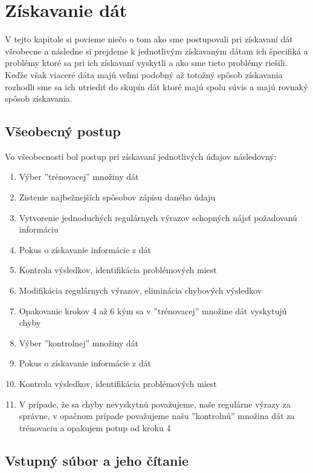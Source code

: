 \chapter{Získavanie dát}
\label{zisk}
V tejto kapitole si povieme niečo o tom ako sme postupovali pri získavaní dát všeobecne a následne si prejdeme k jednotlivým získavaným dátam ich špecifiká a problémy ktoré sa pri ich získavaní vyskytli a ako sme tieto problémy riešili. Keďže však viaceré dáta majú veľmi podobný až totožný spôsob získavania rozhodli sme sa ich utriediť do skupín dát ktoré majú spolu súvis a majú rovnaký spôsob získavania.

\section{Všeobecný postup}

Vo všeobecnosti bol postup pri získavaní jednotlivých údajov následovný:

\begin{enumerate}
	\item Výber ''trénovacej'' množiny dát 
	\item Zistenie najbežnejších spôsobov zápisu daného údaju
	\item Vytvorenie jednoduchých regulárnych výrazov schopných nájsť požadovanú informáciu
	\item Pokus o získavanie informácie z dát
	\item Kontrola výsledkov, identifikácia problémových miest 
	\item Modifikácia regulárnych výrazov, eliminácia chybových výsledkov
	\item Opakovanie krokov 4 až 6 kým sa v ''trénovacej'' množine dát vyskytujú chyby 
	\item Výber ''kontrolnej'' množiny dát
	\item Pokus o získavanie informácie z dát
	\item Kontrola výsledkov, identifikácia problémových miest
	\item V prípade, že sa chyby nevyskytnú považujeme, naše regulárne výrazy za správne, v opačnom prípade považujeme našu ''kontrolnú'' množina dát za trénovaciu a opakujem potup od kroku 4 
\end{enumerate}

\section{Vstupný súbor a jeho čítanie}

